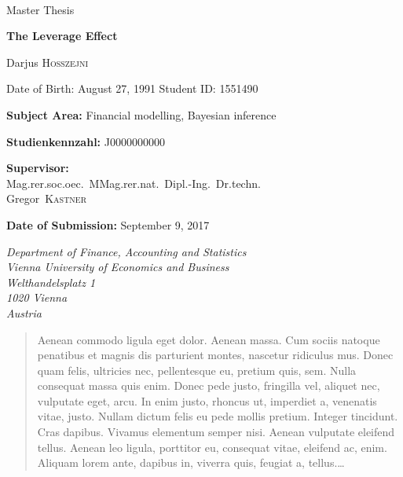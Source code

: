 \documentclass[a4paper, 12pt, twppages]{article}
\newcommand\BackgroundPic{%
\put(0,0){%
\parbox[b][\paperheight]{\paperwidth}{%
\vfill
\centering
\texttt{[image: background.pdf]}%
\vfill
}}}
\begin{document}

\pagebreak

\AddToShipoutPicture*{\BackgroundPic}
\thispagestyle{fancy}


{\vspace{2cm}~}
{\vspace{2cm}}

{\noindent\large Master Thesis}


\vspace{1cm}

{\noindent\huge\textbf{The Leverage Effect}}

\bigskip

{\noindent\LARGE Darjus \textsc{Hosszejni}}

\bigskip
{\noindent\small Date of Birth: August 27, 1991}\newline
{\noindent\small Student ID: 1551490}

\bigskip
{\vspace{2cm}}
{\noindent\large {\bf Subject Area:} Financial modelling, Bayesian inference}

\bigskip
{\noindent\large {\bf Studienkennzahl:} J0000000000}

\bigskip


{\noindent\large {\bf Supervisor:}\\ Mag.rer.soc.oec.~MMag.rer.nat.~Dipl.-Ing.~Dr.techn.\\
Gregor~\textsc{Kastner}}

\bigskip

{\noindent\large {\bf Date of Submission:} September 9, 2017}

\bigskip\bigskip\bigskip\bigskip\bigskip\bigskip

{\em\noindent Department of Finance, Accounting and Statistics\\
Vienna University of Economics and Business\\
Welthandelsplatz 1\\
1020 Vienna\\
Austria
}


\pagestyle{empty}
\pagebreak
\tableofcontents
\pagebreak
\listoffigures
\pagebreak
\listoftables
\pagebreak


\begin{abstract}
Aenean commodo ligula eget dolor. Aenean massa. Cum sociis natoque penatibus et magnis dis parturient montes, nascetur ridiculus mus. Donec quam felis, ultricies nec, pellentesque eu, pretium quis, sem. Nulla consequat massa quis enim. Donec pede justo, fringilla vel, aliquet nec, vulputate eget, arcu. In enim justo, rhoncus ut, imperdiet a, venenatis vitae, justo. Nullam dictum felis eu pede mollis pretium. Integer tincidunt. Cras dapibus. Vivamus elementum semper nisi. Aenean vulputate eleifend tellus. Aenean leo ligula, porttitor eu, consequat vitae, eleifend ac, enim. Aliquam lorem ante, dapibus in, viverra quis, feugiat a, tellus.\dots
\end{abstract}

\pagebreak









\end{document}
